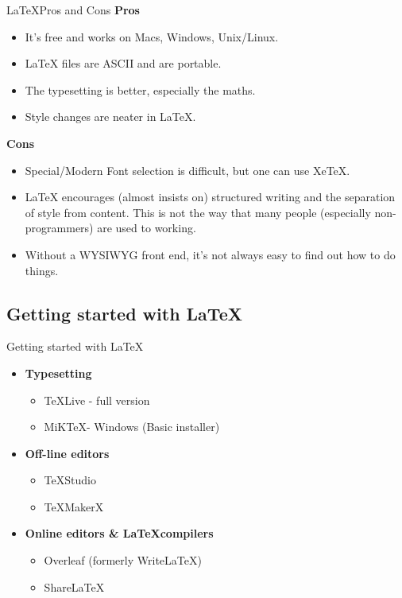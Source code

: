 \documentclass[10pt,times]{beamer}
\begin{document}

\begin{frame}{\LaTeX Pros and Cons}
\textbf{Pros}
\begin{itemize}
\item    It's free and works on Macs, Windows, Unix/Linux.
\item    LaTeX files are ASCII and are portable.
\item    The typesetting is better, especially the maths.
\item    Style changes are neater in LaTeX.
\end{itemize}
\textbf{Cons}
\begin{itemize}
\item    Special/Modern Font selection is difficult, but one can use XeTeX.
\item    LaTeX encourages (almost insists on) structured writing and the 
separation of style from content. This is not the way that many people 
(especially non-programmers) are used to working.
\item    Without a WYSIWYG front end, it's not always easy to find out how to 
do things.
\end{itemize}
\end{frame}

\subsection{Getting started with \LaTeX}
\begin{frame}{Getting started with \LaTeX}
\begin{itemize}
\item \textbf{Typesetting}
\begin{itemize}
\item \TeX Live - full version
\item MiK\TeX - Windows (Basic installer)
\end{itemize}
\item \textbf{Off-line editors}
\begin{itemize}
\item \TeX Studio
\item \TeX MakerX
\end{itemize}
\item \textbf{Online editors \& \LaTeX compilers}
\begin{itemize}
\item Overleaf (formerly Write\LaTeX)
\item Share\LaTeX
\end{itemize}

\end{itemize}

\end{frame}
\end{document}

